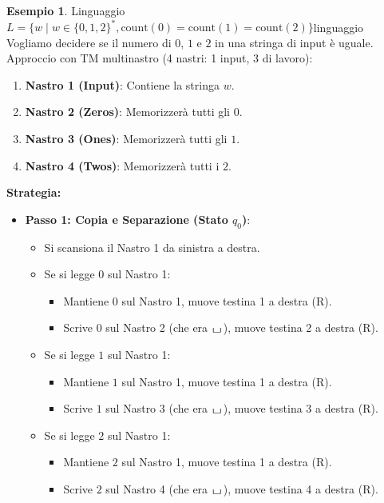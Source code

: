 \documentclass[a4paper]{article}
\theoremstyle{definition} %
\newtheorem{example}{Esempio}
\newcommand{\blankS}{\ensuremath{\raisebox{-0.15ex}{\scalebox{1.3}[0.7]{$\sqcup$}}\mkern2mu}}
\begin{document}
\begin{example}{Linguaggio $L = \{w \mid w \in \{0,1,2\}^*, \text{count}(0)=\text{count}(1)=\text{count}(2)\}$}{linguaggio}
Vogliamo decidere se il numero di $0$, $1$ e $2$ in una stringa di input è uguale.
Approccio con TM multinastro (4 nastri: 1 input, 3 di lavoro):
\begin{enumerate}
    \item \textbf{Nastro 1 (Input)}: Contiene la stringa $w$.
    \item \textbf{Nastro 2 (Zeros)}: Memorizzerà tutti gli $0$.
    \item \textbf{Nastro 3 (Ones)}: Memorizzerà tutti gli $1$.
    \item \textbf{Nastro 4 (Twos)}: Memorizzerà tutti i $2$.
\end{enumerate}
\textbf{Strategia:}
\begin{itemize}
    \item \textbf{Passo 1: Copia e Separazione (Stato $q_0$)}:
        \begin{itemize}
            \item Si scansiona il Nastro 1 da sinistra a destra.
            \item Se si legge $0$ sul Nastro 1:
                \begin{itemize}
                    \item Mantiene $0$ sul Nastro 1, muove testina 1 a destra (R).
                    \item Scrive $0$ sul Nastro 2 (che era $\blankS$), muove testina 2 a destra (R).
                \end{itemize}
            \item Se si legge $1$ sul Nastro 1:
                \begin{itemize}
                    \item Mantiene $1$ sul Nastro 1, muove testina 1 a destra (R).
                    \item Scrive $1$ sul Nastro 3 (che era $\blankS$), muove testina 3 a destra (R).
                \end{itemize}
            \item Se si legge $2$ sul Nastro 1:
                \begin{itemize}
                    \item Mantiene $2$ sul Nastro 1, muove testina 1 a destra (R).
                    \item Scrive $2$ sul Nastro 4 (che era $\blankS$), muove testina 4 a destra (R).
                \end{itemize}

\end{itemize}
\end{itemize}
\end{example}
\end{document}
